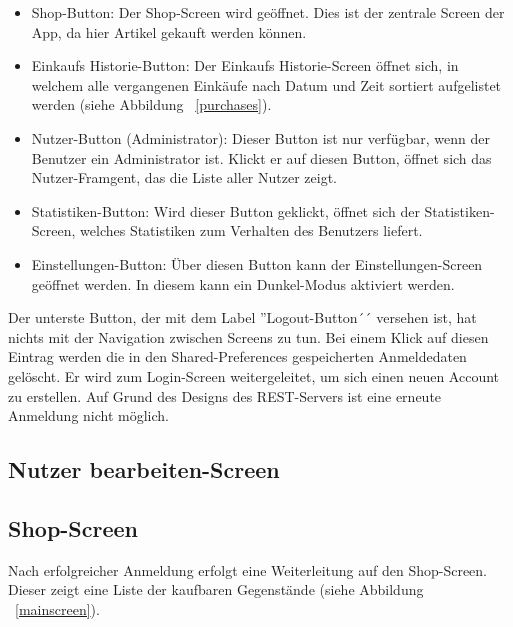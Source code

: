 \begin{itemize}
	\item Shop-Button: Der Shop-Screen wird geöffnet.
	Dies ist der zentrale Screen der App, da hier Artikel gekauft werden können.

	\item Einkaufs Historie-Button: Der Einkaufs Historie-Screen öffnet sich, in welchem alle vergangenen Einkäufe nach Datum und Zeit sortiert aufgelistet werden (siehe Abbildung ~\ref{purchases}).

	\item Nutzer-Button (Administrator): Dieser Button ist nur verfügbar, wenn der Benutzer ein Administrator ist.
	Klickt er auf diesen Button, öffnet sich das Nutzer-Framgent, das die Liste aller Nutzer zeigt.

	\item Statistiken-Button: Wird dieser Button geklickt, öffnet sich der Statistiken-Screen, welches Statistiken zum Verhalten des Benutzers liefert.

	\item Einstellungen-Button: Über diesen Button kann der Einstellungen-Screen geöffnet werden.
	In diesem kann ein Dunkel-Modus aktiviert werden.

\end{itemize}

Der unterste Button, der mit dem Label ''Logout-Button´´ versehen ist, hat nichts mit der Navigation zwischen Screens zu tun.
Bei einem Klick auf diesen Eintrag werden die in den Shared-Preferences gespeicherten Anmeldedaten gelöscht.
Er wird zum Login-Screen weitergeleitet, um sich einen neuen Account zu erstellen.
Auf Grund des Designs des REST-Servers ist eine erneute Anmeldung nicht möglich.

\subsection{Nutzer bearbeiten-Screen} \label{subsec:edit-user-screen}

\subsection{Shop-Screen}\label{subsec:shop-screen}

Nach erfolgreicher Anmeldung erfolgt eine Weiterleitung auf den Shop-Screen.
Dieser zeigt eine Liste der kaufbaren Gegenstände (siehe Abbildung ~\ref{mainscreen}).


